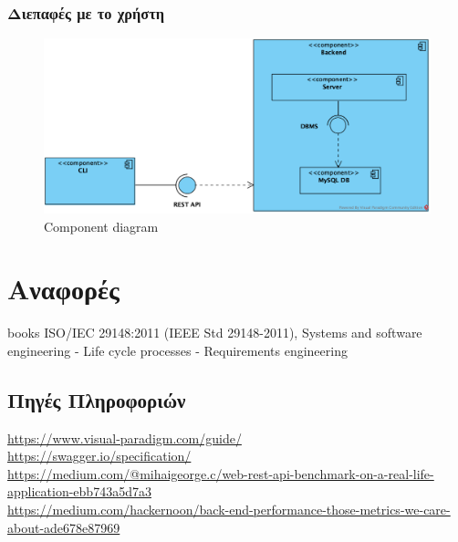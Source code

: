 \documentclass[a4paper,12pt, oneside]{article}
\begin{document}
\subsubsection{Διεπαφές με το χρήστη}
\begin{figure}[h]
\includegraphics[width=1\textwidth]{./UML/Component_Diagram.png}
\caption{\textlatin{Component diagram}}
\centering
\end{figure}


\section{Αναφορές}
\begingroup
\renewcommand{\section}[2]{}
\begin{thebibliography} {books}
\latintext
{} ISO/IEC 29148:2011 (IEEE Std 29148-2011), Systems and software engineering - Life cycle processes - Requirements engineering
\end{thebibliography}
\endgroup

\subsection*{Πηγές Πληροφοριών}
\latintext
\href{https://www.visual-paradigm.com/guide/}{https://www.visual-paradigm.com/guide/} \\
\href{https://swagger.io/specification/}{https://swagger.io/specification/}\\
\href{https://medium.com/@mihaigeorge.c/web-rest-api-benchmark-on-a-real-life-application-ebb743a5d7a3}{https://medium.com/@mihaigeorge.c/web-rest-api-benchmark-on-a-real-life-application-ebb743a5d7a3}\\
\href{https://medium.com/hackernoon/back-end-performance-those-metrics-we-care-about-ade678e87969}{https://medium.com/hackernoon/back-end-performance-those-metrics-we-care-about-ade678e87969}
\newpage
\greektext
\end{document}
